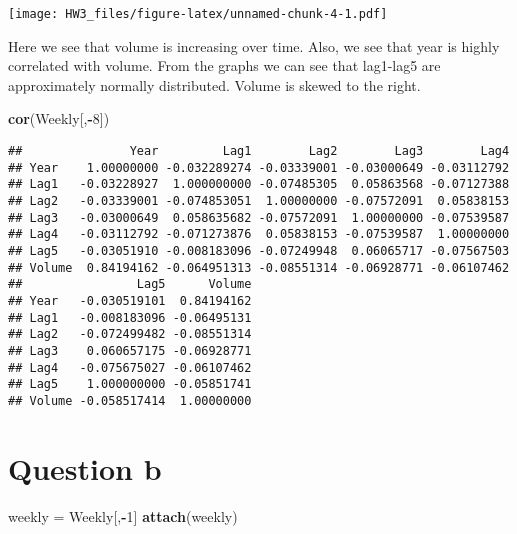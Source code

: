 \documentclass[]{article}
\newenvironment{Shaded}{\begin{snugshade}}{\end{snugshade}}
\newcommand{\KeywordTok}[1]{\textcolor[rgb]{0.13,0.29,0.53}{\textbf{#1}}}
\newcommand{\DecValTok}[1]{\textcolor[rgb]{0.00,0.00,0.81}{#1}}
\newcommand{\StringTok}[1]{\textcolor[rgb]{0.31,0.60,0.02}{#1}}
\newcommand{\OperatorTok}[1]{\textcolor[rgb]{0.81,0.36,0.00}{\textbf{#1}}}
\newcommand{\NormalTok}[1]{#1}
\begin{document}
\begin{Shaded}
\end{Shaded}

\texttt{[image: HW3\_files/figure-latex/unnamed-chunk-4-1.pdf]}

Here we see that volume is increasing over time. Also, we see that year
is highly correlated with volume. From the graphs we can see that
lag1-lag5 are approximately normally distributed. Volume is skewed to
the right.

\begin{Shaded}
\begin{Highlighting}[]
\KeywordTok{cor}\NormalTok{(Weekly[,}\OperatorTok{-}\DecValTok{8}\NormalTok{])}
\end{Highlighting}
\end{Shaded}

\begin{verbatim}
##               Year         Lag1        Lag2        Lag3        Lag4
## Year    1.00000000 -0.032289274 -0.03339001 -0.03000649 -0.03112792
## Lag1   -0.03228927  1.000000000 -0.07485305  0.05863568 -0.07127388
## Lag2   -0.03339001 -0.074853051  1.00000000 -0.07572091  0.05838153
## Lag3   -0.03000649  0.058635682 -0.07572091  1.00000000 -0.07539587
## Lag4   -0.03112792 -0.071273876  0.05838153 -0.07539587  1.00000000
## Lag5   -0.03051910 -0.008183096 -0.07249948  0.06065717 -0.07567503
## Volume  0.84194162 -0.064951313 -0.08551314 -0.06928771 -0.06107462
##                Lag5      Volume
## Year   -0.030519101  0.84194162
## Lag1   -0.008183096 -0.06495131
## Lag2   -0.072499482 -0.08551314
## Lag3    0.060657175 -0.06928771
## Lag4   -0.075675027 -0.06107462
## Lag5    1.000000000 -0.05851741
## Volume -0.058517414  1.00000000
\end{verbatim}

\section{Question b}\label{question-b}

\begin{Shaded}
\begin{Highlighting}[]
\NormalTok{weekly =}\StringTok{ }\NormalTok{Weekly[,}\OperatorTok{-}\DecValTok{1}\NormalTok{]}
\KeywordTok{attach}\NormalTok{(weekly)}
\end{Highlighting}
\end{Shaded}
\end{document}
